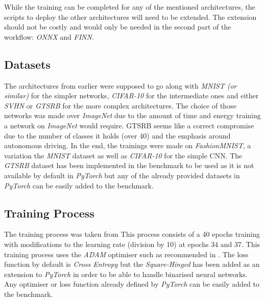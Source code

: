 While the training can be completed for any of the mentioned architectures, the scripts to deploy the other architectures will need to be extended. The extension should not be costly and would only be needed in the second part of the workflow: \emph{ONNX} and \emph{FINN}.


\subsection{Datasets}

The architectures from earlier were supposed to go along with \emph{MNIST (or similar)} for the simpler networks, \emph{CIFAR-10} for the intermediate ones and either \emph{SVHN} or \emph{GTSRB} for the more complex architectures. The choice of those networks was made over \emph{ImageNet} due to the amount of time and energy training a network on \emph{ImageNet} would require. GTSRB seems like a correct compromise due to the number of classes it holds (over 40) and the emphasis around autonomous driving. In the end, the trainings were made on \emph{FashionMNIST}, a variation the \emph{MNIST} dataset as well as \emph{CIFAR-10} for the simple CNN. The \emph{GTSRB} dataset has been implemented in the benchmark to be used as it is not available by default in \emph{PyTorch} but any of the already provided datasets in \emph{PyTorch} can be easily added to the benchmark.



\subsection{Training Process}


The training process was taken from \cite{} This process consists of a 40 epochs training with modifications to the learning rate (division by 10) at epochs 34 and 37. This training process uses the \emph{ADAM} optimiser such as recommended in \cite{}. The loss function by default is \emph{Cross Entropy} but the \emph{Square-Hinged} has been added as an extension to \emph{PyTorch} in order to be able to handle binarised neural networks. Any optimiser or loss function already defined by \emph{PyTorch} can be easily added to the benchmark.

